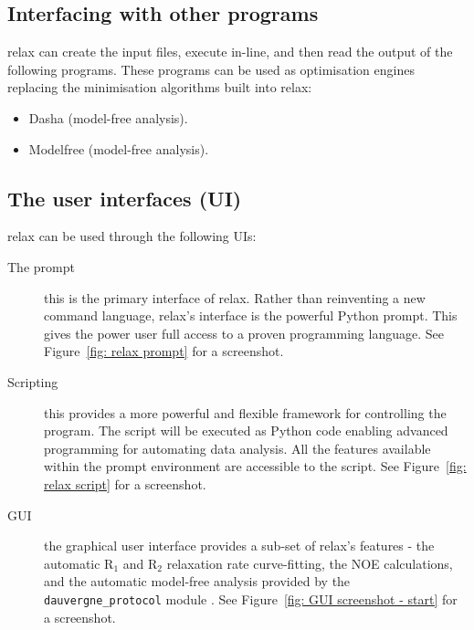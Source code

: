 
\subsection{Interfacing with other programs}

relax can create the input files, execute in-line, and then read the output of the following programs. These programs can be used as optimisation engines replacing the minimisation algorithms built into relax:

\begin{itemize}
\item Dasha (model-free analysis).
\item Modelfree (model-free analysis).
\end{itemize}



\subsection{The user interfaces (UI)}

relax can be used through the following UIs:

\begin{description}
\item[The prompt] this is the primary interface of relax. Rather than reinventing a new command language, relax's interface is the powerful Python prompt. This gives the power user full access to a proven programming language.  See Figure~\ref{fig: relax prompt} for a screenshot.
\item[Scripting] this provides a more powerful and flexible framework for controlling the program. The script will be executed as Python code enabling advanced programming for automating data analysis. All the features available within the prompt environment are accessible to the script.  See Figure~\ref{fig: relax script} for a screenshot.
\item[GUI] the graphical user interface provides a sub-set of relax's features - the automatic R$_1$ and R$_2$ relaxation rate curve-fitting, the NOE calculations, and the automatic model-free analysis provided by the \texttt{dauvergne\_protocol} module \citep{dAuvergneGooley08b}.  See Figure~\ref{fig: GUI screenshot - start} for a screenshot.
\end{description}



